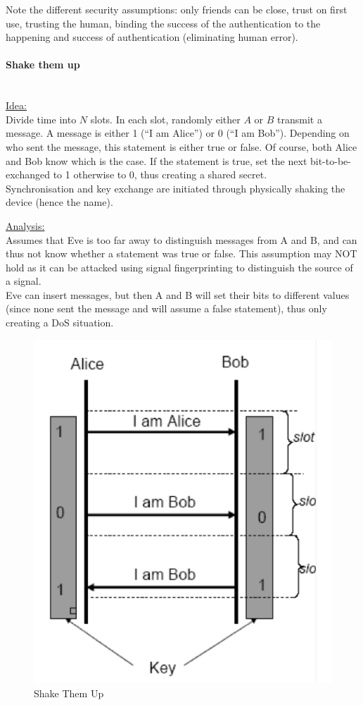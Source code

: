 Note the different security assumptions:
only friends can be close, trust on first use, trusting the human, binding the success of the authentication to the happening and success of authentication (eliminating human error).

\paragraph{Shake them up} \mbox{} \\
\underline{Idea:} \\
Divide time into $N$ slots.
In each slot, randomly either $A$ or $B$ transmit a message.
A message is either 1 (``I am Alice'') or 0 (``I am Bob'').
Depending on who sent the message, this statement is either true or false.
Of course, both Alice and Bob know which is the case.
If the statement is true, set the next bit-to-be-exchanged to 1 otherwise to 0, thus creating a shared secret.
\\
Synchronisation and key exchange are initiated through physically shaking the device (hence the name).

\underline{Analysis:} \\
Assumes that Eve is too far away to distinguish messages from A and B, and can thus not know whether a statement was true or false.
This assumption may NOT hold as it can be attacked using signal fingerprinting to distinguish the source of a signal.
\\
Eve can insert messages, but then A and B will set their bits to different values (since none sent the message and will assume a false statement), thus only creating a DoS situation.

\begin{figure}[h]
	\centering
	\includegraphics[scale=0.45]{images/8-shake.png}
	\caption{Shake Them Up}
	\label{fig:shake}
\end{figure}

